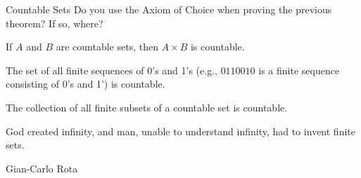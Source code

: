 \begin{section}{Countable Sets}
Do you use the Axiom of Choice when proving the previous theorem?  If so, where?

\begin{theorem}
If $A$ and $B$ are countable sets, then $A\times B$ is countable.
\end{theorem}

\begin{theorem}
The set of all finite sequences of 0's and 1's (e.g., $0110010$ is a finite sequence consisting of 0's and 1') is countable. 
\end{theorem}

\begin{theorem}
The collection of all finite subsets of a countable set is countable.
\end{theorem}

\epigraph{God created infinity, and man, unable to understand infinity, had to invent finite sets.}{Gian-Carlo Rota}

\end{section}